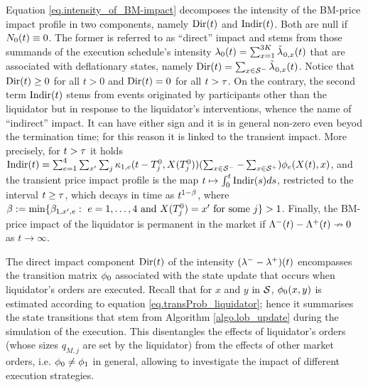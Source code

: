 \documentclass[10pt]{article}
\begin{document}
 Equation \eqref{eq.intensity_of_BM-impact} decomposes the intensity of the BM-price impact profile in two components, namely $\directImpact(t)$ and $\indirectImpact(t)$. Both are null if $\countingProc[0] (t) \equiv 0$. The former is referred to as ``direct'' impact and stems from those summands of the execution schedule's intensity $\intensity[0](t) = \sum_{x=1}^{3K}\hybridIntensity_{0,x}(t)$ that are associated with deflationary states, namely $\directImpact(t) = \sum_{x\in\deflationarySpace} \hybridIntensity_{0,x}(t)$. Notice that $\directImpact(t)\geq 0$ for all $t>0$ and  $\directImpact(t) = 0$ for all $t>\terminationTime$. On the contrary, the second term $\indirectImpact(t)$ stems from events originated by participants other than the liquidator but in response to the liquidator's interventions, whence the name of ``indirect'' impact. It can have either sign and it is in general non-zero even beyod the termination time; for this reason it is linked to the transient impact. More precisely, for $t>\terminationTime$ it holds $\indirectImpact(t) = \sum_{e=1}^{4}\sum_{\xone} \sum_{j} \hawkesKernel_{1,e}(t-\arrivalTimes[0]_j,\stateVariable(\arrivalTimes[0]_j)) (\sum_{x\in \deflationarySpace} - \sum_{x\in \inflationarySpace})\transProb_{e}(\stateVariable(t),x)$, and  the transient price impact profile is the map $t\mapsto \intzerot \indirectImpact(s)ds$, restricted to the interval $t\geq \terminationTime$, which decays in time as $t^{1-\decCoef}$, where $\decCoef := \min\lbrace \decCoef_{1,\xone,e}: \, \, e=1,\dots,4 \text{ and } \stateVariable(\arrivalTimes[0]_j) = \xone \text{ for some }j\rbrace > 1$. Finally, the BM-price impact of the liquidator is permanent in the market if $\compensator^{-}(t) - \compensator^{+}(t) \nrightarrow 0$ as $t\rightarrow\infty$. 
 
 The direct impact component $\directImpact(t)$ of the intensity $(\intensityDeflationary - \intensityInflationary)(t)$ encompasses the transition matrix $\transProb_0$ associated with the state update that occurs when liquidator's orders are executed. Recall that for $x$ and $y$ in $\stateSpace$, $\transProb_{0}(x,y)$ is estimated according to equation \eqref{eq.transProb_liquidator}; hence it summarises the state transitions that stem from Algorithm \ref{algo.lob_update} during the simulation of the execution. This disentangles the effects of liquidator's orders (whose sizes $q_{M,j}$ are set by the liquidator) from the effects of other market orders, i.e. $\transProb_0 \neq \transProb_1$ in general, allowing to investigate the impact of different execution strategies.
 
\end{document}
